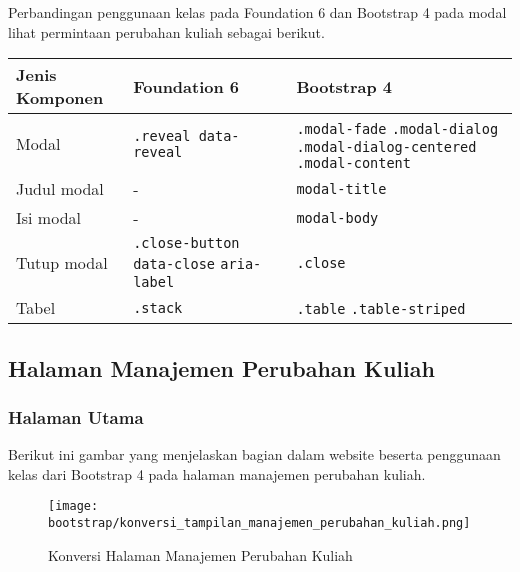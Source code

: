 \noindent Perbandingan penggunaan kelas pada Foundation 6 dan Bootstrap 4 pada modal lihat permintaan perubahan kuliah sebagai berikut.\\
\begin{tabular}{| p{} | p{} | p{} |} 
	\hline
	\textbf{Jenis Komponen} & \textbf{Foundation 6} & \textbf{Bootstrap 4}  \\ [0.5ex] 
	\hline	
	Modal & \texttt{.reveal data-reveal} & \texttt{.modal-fade} \newline \texttt{.modal-dialog} \newline \texttt{.modal-dialog-centered} \newline \texttt{.modal-content} \\
	\hline
	Judul modal & - & \texttt{modal-title}\\
	\hline
	Isi modal & - & \texttt{modal-body}\\
	\hline
	Tutup modal & \texttt{.close-button} \newline \texttt{data-close} \newline \texttt{aria-label} & \texttt{.close}\\
	\hline	
	Tabel & \texttt{.stack} & \texttt{.table} \newline \texttt{.table-striped} \\[1ex]
	\hline
\end{tabular}



\subsection{Halaman Manajemen Perubahan Kuliah}
\subsubsection{Halaman Utama}
\noindent Berikut ini gambar yang menjelaskan bagian dalam website beserta penggunaan kelas dari Bootstrap 4 pada halaman manajemen perubahan kuliah.\\
\begin{figure} [H]
	\centering  
	\texttt{[image: bootstrap/konversi\_tampilan\_manajemen\_perubahan\_kuliah.png]}
	\caption{Konversi Halaman Manajemen Perubahan Kuliah}
\end{figure}

